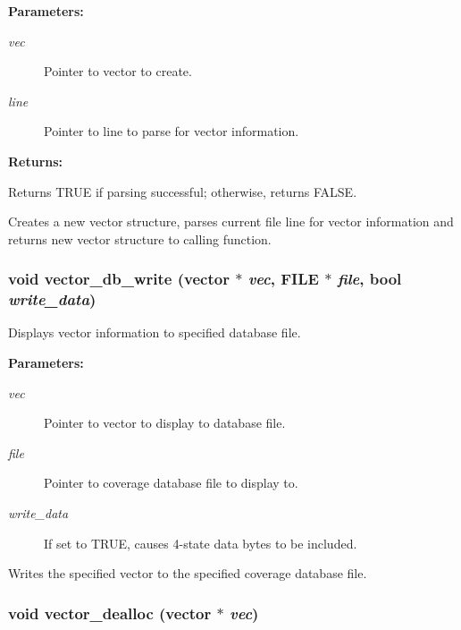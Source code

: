 \begin{Desc}
\item[{\bf Parameters: }]\par
\begin{description}
\item[
{\em vec}]Pointer to vector to create. \item[
{\em line}]Pointer to line to parse for vector information.

\end{description}
\end{Desc}
\begin{Desc}
\item[{\bf Returns: }]\par
Returns TRUE if parsing successful; otherwise, returns FALSE.

\end{Desc}
Creates a new vector structure, parses current file line for vector information and returns new vector structure to calling function. 
\subsubsection{\setlength{\rightskip}{0pt plus 5cm}void vector\_\-db\_\-write ({\bf vector} $\ast$ {\em vec}, FILE $\ast$ {\em file}, {\bf bool} {\em write\_\-data})}\label{vector_8h_a3}


Displays vector information to specified database file.

\begin{Desc}
\item[{\bf Parameters: }]\par
\begin{description}
\item[
{\em vec}]Pointer to vector to display to database file. \item[
{\em file}]Pointer to coverage database file to display to. \item[
{\em write\_\-data}]If set to TRUE, causes 4-state data bytes to be included.

\end{description}
\end{Desc}
Writes the specified vector to the specified coverage database file. 
\subsubsection{\setlength{\rightskip}{0pt plus 5cm}void vector\_\-dealloc ({\bf vector} $\ast$ {\em vec})}\label{vector_8h_a32}


